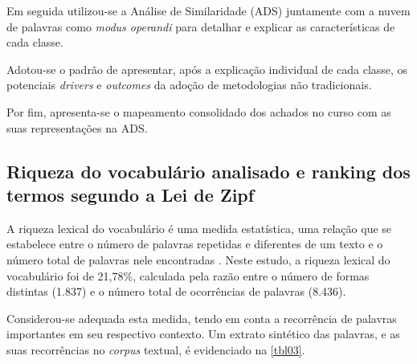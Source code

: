 \documentclass{textolivre}
\begin{document}
Em seguida utilizou-se a Análise de Similaridade (ADS) juntamente com a nuvem de palavras como \textit{modus operandi} para detalhar e explicar as características de cada classe. 

Adotou-se o padrão de apresentar, após a explicação individual de cada classe, os potenciais \textit{drivers} e \textit{outcomes} da adoção de metodologias não tradicionais.

Por fim, apresenta-se o mapeamento consolidado dos achados no curso com as suas representações na ADS. 

\subsection{Riqueza do vocabulário analisado e ranking dos termos segundo a Lei de Zipf}\label{sec-riqueza}
A riqueza lexical do vocabulário é uma medida estatística, uma relação que se estabelece entre o número de palavras repetidas e diferentes de um texto e o número total de palavras nele encontradas \cite{sardinha2008}. Neste estudo, a riqueza lexical do vocabulário foi de 21,78\%, calculada pela razão entre o número de formas distintas (1.837) e o número total de ocorrências de palavras (8.436).

Considerou-se adequada esta medida, tendo em conta a recorrência de palavras importantes em seu respectivo contexto. Um extrato sintético das palavras, e as suas recorrências no \textit{corpus} textual, é evidenciado na \cref{tbl03}.


\begin{table}
\caption{Aplicação da Lei de Zipf nos documentos de Engenharia Elétrica e de Computadores.}
\label{tbl03}
\noindent{}
\end{table}
\end{document}
